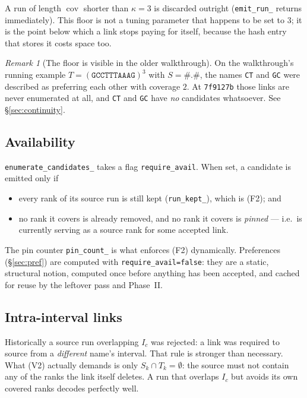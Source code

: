 \documentclass[11pt,a4paper]{article}
\theoremstyle{definition}
\theoremstyle{plain}
\theoremstyle{remark}
\newtheorem{remark}{Remark}
\newcommand{\cov}{\operatorname{cov}}
\begin{document}
A run of length $\cov$ shorter than $\kappa = 3$ is discarded outright
(\texttt{emit\_run\_} returns immediately). This floor is not a
tuning parameter that happens to be set to $3$; it is the point below
which a link stops paying for itself, because the hash entry that stores
it costs space too.

\begin{remark}[The floor is visible in the older walkthrough]
On the walkthrough's running example $T = (\mathtt{GCCTTTAAAG})^3$ with
$S = \mathtt{\#.\#}$, the names \texttt{CT} and \texttt{GC} were
described as preferring each other with coverage $2$. At
\texttt{7f9127b} those links are never enumerated at all, and
\texttt{CT} and \texttt{GC} have \emph{no} candidates whatsoever. See
\S\ref{sec:continuity}.
\end{remark}

\subsection{Availability}

\texttt{enumerate\_candidates\_} takes a flag \texttt{require\_avail}.
When set, a candidate is emitted only if
\begin{itemize}
\item every rank of its source run is still kept
  (\texttt{run\_kept\_}), which is (F2); and
\item no rank it covers is already removed, and no rank it covers is
  \emph{pinned} --- i.e.\ is currently serving as a source rank for some
  accepted link.
\end{itemize}
The pin counter \texttt{pin\_count\_} is what enforces (F2) dynamically.
Preferences (\S\ref{sec:pref}) are computed with
\texttt{require\_avail=false}: they are a static, structural notion,
computed once before anything has been accepted, and cached for reuse by
the leftover pass and Phase~II.

\subsection{Intra-interval links}
\label{sec:intra}

Historically a source run overlapping $I_c$ was rejected: a link was
required to source from a \emph{different} name's interval. That rule is
stronger than necessary. What (V2) actually demands is only
$S_k \cap T_k = \emptyset$: the source must not contain any of the ranks
the link itself deletes. A run that overlaps $I_c$ but avoids its own
covered ranks decodes perfectly well.
\end{document}
